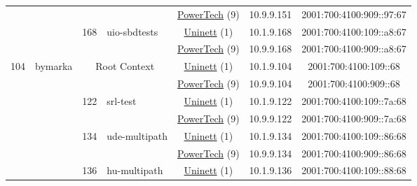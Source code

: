 \begin{small}
\begin{center}
\begin{longtable}{|c|c|c|c|c|c|c|c|}
  &  &  &  & \multicolumn{2}{|c|}{\tiny{\href{http://www.powertech.no}{PowerTech} (9)}} & \tiny{10.9.9.151} & \tiny{2001:700:4100:909::97:67} \\* \cline{3-3}\cline{4-4}\cline{5-5}\cline{6-6}\cline{7-7}\cline{8-8}
  &  & \multirow{2}{*}{\tiny{168}} & \multicolumn{1}{|l|}{\multirow{2}{*}{\tiny{uio-sbdtests}}} & \multicolumn{2}{|c|}{\tiny{\href{https://www.uninett.no}{Uninett} (1)}} & \tiny{10.1.9.168} & \tiny{2001:700:4100:109::a8:67} \\* \cline{5-5}\cline{6-6}\cline{7-7}\cline{8-8}
  &  &  &  & \multicolumn{2}{|c|}{\tiny{\href{http://www.powertech.no}{PowerTech} (9)}} & \tiny{10.9.9.168} & \tiny{2001:700:4100:909::a8:67} \\ \hline
 \multirow{18}{*}{\tiny{104}} & \multicolumn{1}{|l|}{\multirow{18}{*}{\tiny{bymarka}}} & \multicolumn{2}{|c|}{\multirow{2}{*}{\tiny{Root Context}}} & \multicolumn{2}{|c|}{\tiny{\href{https://www.uninett.no}{Uninett} (1)}} & \tiny{10.1.9.104} & \tiny{2001:700:4100:109::68} \\* \cline{5-5}\cline{6-6}\cline{7-7}\cline{8-8}
  &  & \multicolumn{2}{|c|}{} & \multicolumn{2}{|c|}{\tiny{\href{http://www.powertech.no}{PowerTech} (9)}} & \tiny{10.9.9.104} & \tiny{2001:700:4100:909::68} \\* \cline{3-3}\cline{4-4}\cline{5-5}\cline{6-6}\cline{7-7}\cline{8-8}
  &  & \multirow{2}{*}{\tiny{122}} & \multicolumn{1}{|l|}{\multirow{2}{*}{\tiny{srl-test}}} & \multicolumn{2}{|c|}{\tiny{\href{https://www.uninett.no}{Uninett} (1)}} & \tiny{10.1.9.122} & \tiny{2001:700:4100:109::7a:68} \\* \cline{5-5}\cline{6-6}\cline{7-7}\cline{8-8}
  &  &  &  & \multicolumn{2}{|c|}{\tiny{\href{http://www.powertech.no}{PowerTech} (9)}} & \tiny{10.9.9.122} & \tiny{2001:700:4100:909::7a:68} \\* \cline{3-3}\cline{4-4}\cline{5-5}\cline{6-6}\cline{7-7}\cline{8-8}
  &  & \multirow{2}{*}{\tiny{134}} & \multicolumn{1}{|l|}{\multirow{2}{*}{\tiny{ude-multipath}}} & \multicolumn{2}{|c|}{\tiny{\href{https://www.uninett.no}{Uninett} (1)}} & \tiny{10.1.9.134} & \tiny{2001:700:4100:109::86:68} \\* \cline{5-5}\cline{6-6}\cline{7-7}\cline{8-8}
  &  &  &  & \multicolumn{2}{|c|}{\tiny{\href{http://www.powertech.no}{PowerTech} (9)}} & \tiny{10.9.9.134} & \tiny{2001:700:4100:909::86:68} \\* \cline{3-3}\cline{4-4}\cline{5-5}\cline{6-6}\cline{7-7}\cline{8-8}
  &  & \multirow{2}{*}{\tiny{136}} & \multicolumn{1}{|l|}{\multirow{2}{*}{\tiny{hu-multipath}}} & \multicolumn{2}{|c|}{\tiny{\href{https://www.uninett.no}{Uninett} (1)}} & \tiny{10.1.9.136} & \tiny{2001:700:4100:109::88:68} \\* \cline{5-5}\cline{6-6}\cline{7-7}\cline{8-8}

\end{longtable}
\end{center}
\end{small}
